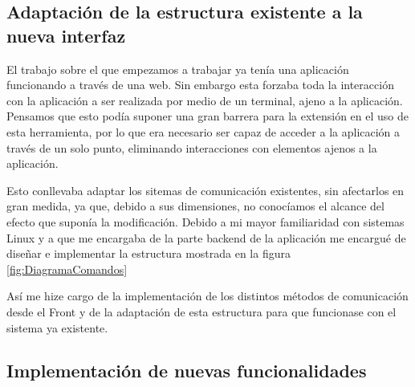 \subsection*{Adaptación de la estructura existente a la nueva interfaz}

El trabajo sobre el que empezamos a trabajar ya tenía una aplicación funcionando a través de una web. Sin embargo esta forzaba toda la interacción con la aplicación a ser realizada por medio de un terminal, ajeno a la aplicación. Pensamos que esto podía suponer una gran barrera para la extensión en el uso de esta herramienta, por lo que era necesario ser capaz de acceder a la aplicación a través de un solo punto, eliminando interacciones con elementos ajenos a la aplicación.

Esto conllevaba adaptar los sitemas de comunicación existentes, sin afectarlos en gran medida, ya que, debido a sus dimensiones, no conocíamos el alcance del efecto que suponía la modificación. Debido a mi mayor familiaridad con sistemas Linux y a que me encargaba de la parte backend de la aplicación me encargué de diseñar e implementar la estructura mostrada en la figura \ref{fig:DiagramaComandos}

Así me hize cargo de la implementación de los distintos métodos de comunicación desde el Front y de la adaptación de esta estructura para que funcionase con el sistema ya existente.

\subsection*{Implementación de nuevas funcionalidades}

